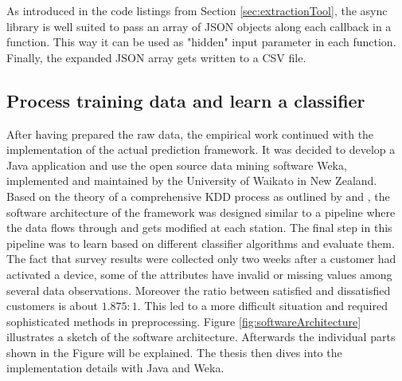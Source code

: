 As introduced in the code listings from Section \ref{sec:extractionTool}, the async library is well suited to pass an array of JSON objects along each callback in a function. This way it can be used as "hidden" input parameter in each function. Finally, the expanded JSON array gets written to a CSV file. 

\subsection{Process training data and learn a classifier}
After having prepared the raw data, the empirical work continued with the implementation of the actual prediction framework. It was decided to develop a Java application and use the open source data mining software Weka, implemented and maintained by the University of Waikato in New Zealand. Based on the theory of a comprehensive KDD process as outlined by \cite{fayyad1996data} and \cite{neckel2015}, the software architecture of the framework was designed similar to a pipeline where the data flows through and gets modified at each station. The final step in this pipeline was to learn based on different classifier algorithms and evaluate them. The fact that survey results were collected only two weeks after a customer had activated a device, some of the attributes have invalid or missing values among several data observations. Moreover the ratio between satisfied and dissatisfied customers is about $1.875:1$. This led to a more difficult situation and required sophisticated methods in preprocessing. Figure \ref{fig:softwareArchitecture} illustrates a sketch of the software architecture. Afterwards the individual parts shown in the Figure will be explained. The thesis then dives into the implementation details with Java and Weka.

